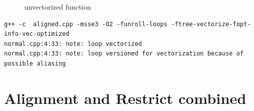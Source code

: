\documentclass[
	12pt,
	a4paper,
	BCOR10mm,
	DIV14,
	headsepline,
	usegeometry,
]{scrreprt}
\begin{document}
\begin{figure}[ht]
        \caption{unvectorized function}
    \end{figure}
\begin{verbatim}
g++ -c  aligned.cpp -msse3 -O2 -funroll-loops -ftree-vectorize-fopt-info-vec-optimized
normal.cpp:4:33: note: loop vectorized
normal.cpp:4:33: note: loop versioned for vectorization because of possible aliasing
\end{verbatim}

\section{Alignment and Restrict combined}
\end{document}
